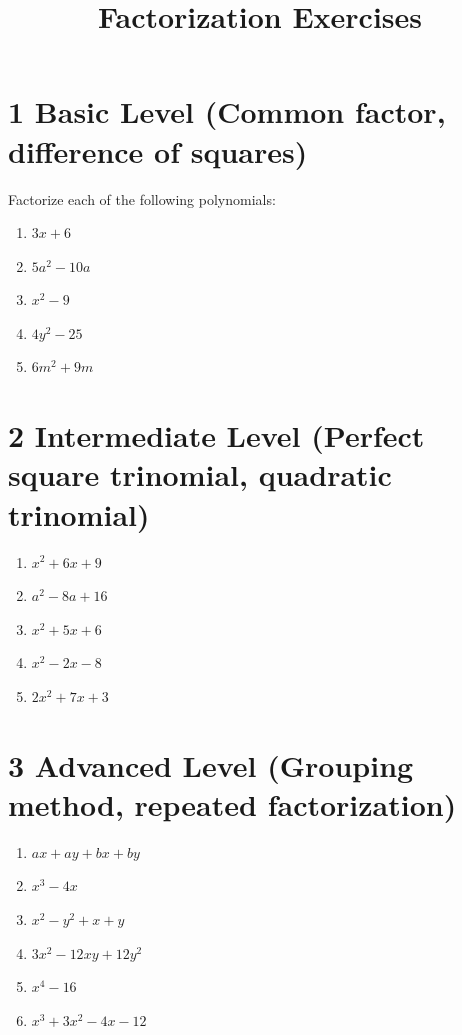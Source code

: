 \documentclass[12pt,a4paper,]{article}
\title{Factorization Exercises}
\author{}
\date{}
\begin{document}
	\maketitle
	\section{1 Basic Level (Common factor, difference of squares)}
	Factorize each of the following polynomials:
	\begin{enumerate}
		\item \(3 x+6\)
		\item \(5 a^{2}-10 a\)
		\item \(x^{2}-9\)
		\item \(4 y^{2}-25\)
		\item \(6 m^{2}+9 m\)
	\end{enumerate}
	\section{2 Intermediate Level (Perfect square trinomial, quadratic trinomial)}
	\begin{enumerate}
		\item \(x^{2}+6 x+9\)
		\item \(a^{2}-8 a+16\)
		\item \(x^{2}+5 x+6\)
		\item \(x^{2}-2 x-8\)
		\item \(2 x^{2}+7 x+3\)
	\end{enumerate}
	\section{3 Advanced Level (Grouping method, repeated factorization)}
	\begin{enumerate}
		\item \(a x+a y+b x+b y\)
		\item \(x^{3}-4 x\)
		\item \(x^{2}-y^{2}+x+y\)
		\item \(3 x^{2}-12 x y+12 y^{2}\)
		\item \(x^{4}-16\)
		\item \(x^{3}+3 x^{2}-4 x-12\)
	\end{enumerate}
\end{document}
